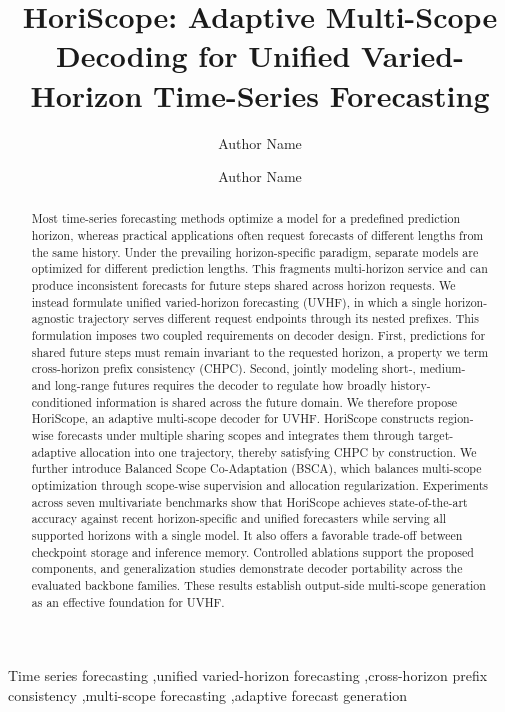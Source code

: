 \documentclass[preprint,12pt]{elsarticle}
\begin{document}
\begin{frontmatter}

\title{HoriScope: Adaptive Multi-Scope Decoding for Unified Varied-Horizon Time-Series Forecasting}

\author[inst1]{Author Name}
\author[inst1]{Author Name}

\begin{abstract}
Most time-series forecasting methods optimize a model for a predefined prediction horizon, whereas practical applications often request forecasts of different lengths from the same history. Under the prevailing horizon-specific paradigm, separate models are optimized for different prediction lengths. This fragments multi-horizon service and can produce inconsistent forecasts for future steps shared across horizon requests. We instead formulate unified varied-horizon forecasting (UVHF), in which a single horizon-agnostic trajectory serves different request endpoints through its nested prefixes. This formulation imposes two coupled requirements on decoder design. First, predictions for shared future steps must remain invariant to the requested horizon, a property we term cross-horizon prefix consistency (CHPC). Second, jointly modeling short-, medium- and long-range futures requires the decoder to regulate how broadly history-conditioned information is shared across the future domain. We therefore propose HoriScope, an adaptive multi-scope decoder for UVHF. HoriScope constructs region-wise forecasts under multiple sharing scopes and integrates them through target-adaptive allocation into one trajectory, thereby satisfying CHPC by construction. We further introduce Balanced Scope Co-Adaptation (BSCA), which balances multi-scope optimization through scope-wise supervision and allocation regularization. Experiments across seven multivariate benchmarks show that HoriScope achieves state-of-the-art accuracy against recent horizon-specific and unified forecasters while serving all supported horizons with a single model. It also offers a favorable trade-off between checkpoint storage and inference memory. Controlled ablations support the proposed components, and generalization studies demonstrate decoder portability across the evaluated backbone families. These results establish output-side multi-scope generation as an effective foundation for UVHF.
\end{abstract}

\begin{keyword}
Time series forecasting \sep unified varied-horizon forecasting \sep cross-horizon prefix consistency \sep multi-scope forecasting \sep adaptive forecast generation
\end{keyword}

\end{frontmatter}
\end{document}
